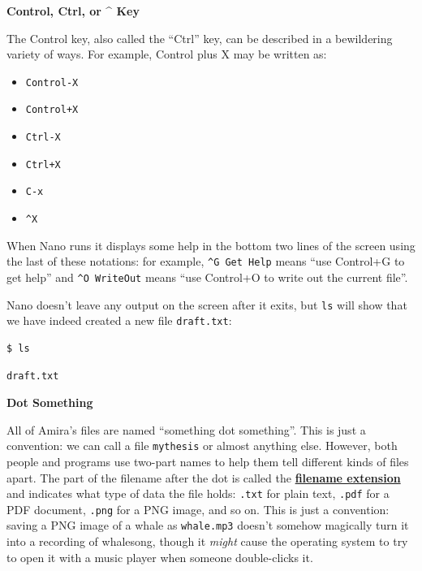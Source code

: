 \documentclass[
]{krantz}
\providecommand{\tightlist}{%
  \setlength{\itemsep}{0pt}\setlength{\parskip}{0pt}}
\renewenvironment{quote}{\begin{VF}}{\end{VF}}
\newcommand{\gref}[2]{\hyperlink{#2}{\textbf{#1}}}
\begin{document}
\begin{quote}
\textbf{Control, Ctrl, or \^{} Key}

The Control key,
also called the ``Ctrl'' key,
can be described in a bewildering variety of ways.
For example,
Control plus X may be written as:

\begin{itemize}
\tightlist
\item
  \texttt{Control-X}
\item
  \texttt{Control+X}
\item
  \texttt{Ctrl-X}
\item
  \texttt{Ctrl+X}
\item
  \texttt{C-x}
\item
  \texttt{\^{}X}
\end{itemize}

When Nano runs
it displays some help in the bottom two lines of the screen
using the last of these notations:
for example,
\texttt{\^{}G\ Get\ Help} means ``use Control+G to get help''
and \texttt{\^{}O\ WriteOut} means ``use Control+O to write out the current file''.
\end{quote}

Nano doesn't leave any output on the screen after it exits,
but \texttt{ls} will show that we have indeed created a new file \texttt{draft.txt}:

\begin{verbatim}
$ ls
\end{verbatim}

\begin{verbatim}
draft.txt
\end{verbatim}

\begin{quote}
\textbf{Dot Something}

All of Amira's files are named ``something dot something''.
This is just a convention:
we can call a file \texttt{mythesis} or almost anything else.
However,
both people and programs use two-part names to help them tell different kinds of files apart.
The part of the filename after the dot
is called the \gref{filename extension}{filename\_extension}
and indicates what type of data the file holds:
\texttt{.txt} for plain text,
\texttt{.pdf} for a PDF document,
\texttt{.png} for a PNG image, and so on.
This is just a convention:
saving a PNG image of a whale as \texttt{whale.mp3}
doesn't somehow magically turn it into a recording of whalesong,
though it \emph{might} cause the operating system to try to open it with a music player
when someone double-clicks it.
\end{quote}
\end{document}
